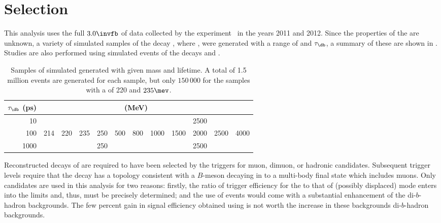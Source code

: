 \section{Selection}
\label{sec:db:sel}

This analysis uses the full $3.0\invfb$ of data collected by the \lhcb
experiment~\cite{Alves:2008zz} in the years 2011 and 2012.
Since the properties of the \db are unknown, a variety of simulated samples of the decay \btokstrdb,
where \dbtomumu, were generated with a range of \mass{\db} and $\tau_\db$, a summary of these are
shown in .
Studies are also performed using simulated events of the decays \btokstrmumu and \btojpsikstr.

\begin{table}
  \caption[Samples of simulated \btokstrdb generated for the analysis]{
    Samples of simulated \btokstrdb generated with given mass and lifetime.
    A total of 1.5 million events are generated for each sample, but only $150\,000$ for the
    samples with a \mass{\db} of 220 and $235\mev$.
  }
  \label{tab:db:samples}
  \begin{center}
    \begin{tabular}{rccccccccccc}\toprule
      $\tau_\db$ (ps) & \multicolumn{10}{c}{\mass{\db} (MeV)} \\\midrule
      10 &&&&&&&&&2500 \\
      100 &214&220&235&250&500&800&1000&1500&2000&2500&4000 \\
      1000 &&&&250&&&&&2500 \\
      \bottomrule
    \end{tabular}
  \end{center}
\end{table}

Reconstructed decays of \btokstrdb are required to have been selected by the \lone triggers for
muon, dimuon, or hadronic candidates.
Subsequent trigger levels require that the decay has a topology consistent with a $B$-meson
decaying in to a multi-body final state which includes muons.
Only \TOS candidates are used in this analysis for two reasons: firstly, the ratio of trigger
efficiency for the \sm \btokstrmumu to that of (possibly displaced) \db mode enters
into the limits and, thus, must be precisely determined; and the use of \TIS events would
come with a substantial enhancement of the di-$b$-hadron backgrounds.
The few percent gain in signal efficiency obtained using \TIS is not worth the increase in these
backgrounds di-$b$-hadron backgrounds.


